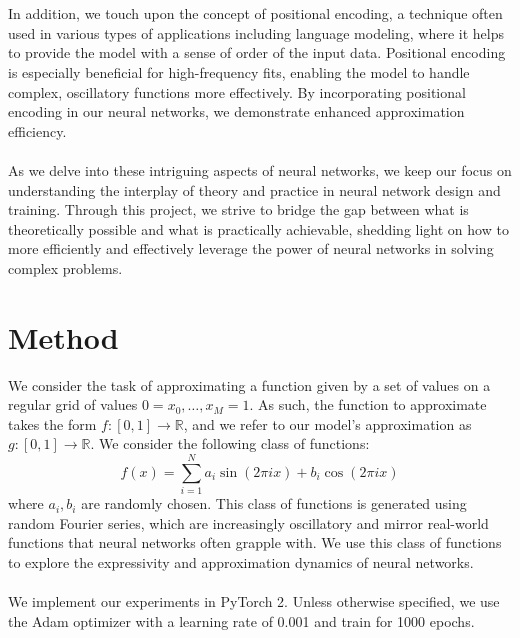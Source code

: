\documentclass[11pt]{article}
\begin{document}
\\\\
In addition, we touch upon the concept of positional encoding, a technique often used in various types of applications including language modeling, where it helps to provide the model with a sense of order of the input data. Positional encoding is especially beneficial for high-frequency fits, enabling the model to handle complex, oscillatory functions more effectively. By incorporating positional encoding in our neural networks, we demonstrate enhanced approximation efficiency.
\\\\
As we delve into these intriguing aspects of neural networks, we keep our focus on understanding the interplay of theory and practice in neural network design and training. Through this project, we strive to bridge the gap between what is theoretically possible and what is practically achievable, shedding light on how to more efficiently and effectively leverage the power of neural networks in solving complex problems.

\section{Method}
We consider the task of approximating a function given by a set of values on a regular grid of values {$0 = x_0, \hdots, x_M = 1$}. As such, the function to approximate takes the form $f: [0, 1] \rightarrow \mathbb{R}$, and we refer to our model's approximation as $g: [0, 1] \rightarrow \mathbb{R}$. We consider the following class of functions:
\begin{equation}
    f(x) = \sum_{i=1}^{N} a_i \sin(2\pi i x) + b_i \cos(2\pi i x)
\end{equation}
where $a_i, b_i$ are randomly chosen. This class of functions is generated using random Fourier series, which are increasingly oscillatory and mirror real-world functions that neural networks often grapple with. We use this class of functions to explore the expressivity and approximation dynamics of neural networks.
\\\\
We implement our experiments in PyTorch 2. Unless otherwise specified, we use the Adam optimizer with a learning rate of 0.001 and train for 1000 epochs.
\end{document}
